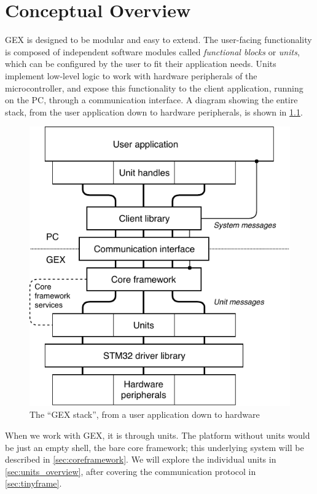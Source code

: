 \chapter{Conceptual Overview} \label{sec:conceptual}

GEX is designed to be modular and easy to extend. The user-facing functionality is composed of independent software modules called \textit{functional blocks} or \textit{units}, which can be configured by the user to fit their application needs. Units implement low-level logic to work with hardware peripherals of the microcontroller, and expose this functionality to the client application, running on the \gls{PC}, through a communication interface. A diagram showing the entire stack, from the user application down to hardware peripherals, is shown in \cref{fig:conceptual}.

\begin{figure}[h]
	\centering
	\includegraphics[scale=1]{img/conceptual.pdf}
	\caption[GEX conceptual overview]{\label{fig:conceptual}The ``GEX stack'', from a user application down to hardware}
\end{figure}

When we work with GEX, it is through units. The platform without units would be just an empty shell, the bare core framework; this underlying system will be described in \cref{sec:coreframework}. We will explore the individual units in \cref{sec:units_overview}, after covering the communication protocol in \cref{sec:tinyframe}. 

